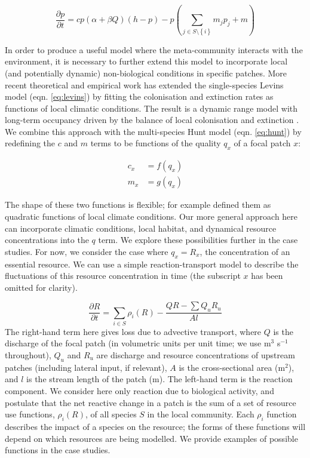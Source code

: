 \documentclass[11pt,a4paper]{article}
\begin{document}
\begin{equation}
	\frac{\partial p}{\partial t} = c p(\alpha + \beta Q) \left( h-p \right) - p \left( \sum_{j \in S \setminus \left\{i \right\} }{m_{j}p_j} + m \right)
	\label{eq:metacom}
\end{equation}

In order to produce a useful model where the meta-community interacts with the environment, it is necessary to further extend this model to incorporate local (and potentially dynamic) non-biological conditions in specific patches.
More recent theoretical \autocite{Holt2000,Holt2005} and empirical \autocite{Talluto2017} work has extended the single-species Levins model (eqn. \ref{eq:levins}) by fitting the colonisation and extinction rates as functions of local climatic conditions.
The result is a dynamic range model with long-term occupancy driven by the balance of local colonisation and extinction \autocite{Talluto2017}.
We combine this approach with the multi-species Hunt model (eqn. \ref{eq:hunt}) by redefining the $c$ and $m$ terms to be functions of the quality $q_x$ of a focal patch $x$:

\begin{equation}
\begin{split}
	c_{x} &= f(q_{x}) \label{eq:talluto} \\
	m_{x} &= g(q_{x})
\end{split}
\end{equation}


The shape of these two functions is flexible; for example \textcite{Talluto2017} defined them as quadratic functions of local climate conditions.
Our more general approach here can incorporate climatic conditions, local habitat, and dynamical resource concentrations into the $q$ term.
We explore these possibilities further in the case studies.
For now, we consider the case where $q_x = R_x$, the concentration of an essential resource.
We can use a simple reaction-transport model \autocite{Soetaert2009} to describe the fluctuations of this resource concentration in time (the subscript $x$ has been omitted for clarity).

\begin{equation}
	\frac{\partial R}{\partial t} = \sum_{i \in S}{\rho_i(R)} -\frac{QR - \sum Q_u R_u}{A l} 
	\label{eq:rxn_transport}
\end{equation}
The right-hand term here gives loss due to advective transport, where $Q$ is the discharge of the focal patch (in volumetric units per unit time; we use m$^3$ s$^{-1}$ throughout), $Q_u$ and $R_u$ are discharge and resource concentrations of upstream patches (including lateral input, if relevant), $A$ is the cross-sectional area (m$^2$), and $l$ is the stream length of the patch (m).
The left-hand term is the reaction component.
We consider here only reaction due to biological activity, and postulate that the net reactive change in a patch is the sum of a set of resource use functions, $\rho_i(R)$, of all species $S$ in the local community. 
Each $\rho_i$ function describes the impact of a species on the resource; the forms of these functions will depend on which resources are being modelled.
We provide examples of possible functions in the case studies.
\end{document}
